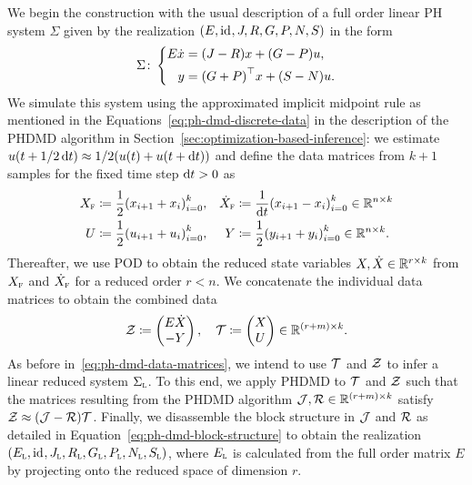 We begin the construction with the usual description of a full order linear \ac{PH} system $\Sigma$ given by the realization $(E, \text{id}_{}, J, R, G, P, N, S)$ in the form
\begin{equation*}
    \Sigma \colon \left\lbrace
    \begin{aligned}
        E \dot{x} &= (J - R) x + (G - P) u, \\
        y &= {(G + P)}^{\top} x + (S - N) u.
    \end{aligned}
    \right.
\end{equation*}
We simulate this system using the approximated implicit midpoint rule as mentioned in the Equations~\eqref{eq:ph-dmd-discrete-data} in the description of the \ac{PHDMD} algorithm in Section~\ref{sec:optimization-based-inference}: we estimate $u(t + 1 / 2 \mathop{}\!\mathrm{d} t) \approx 1 / 2 (u(t) + u(t + \mathop{}\!\mathrm{d} t))$ and define the data matrices from $k + 1$ samples for the fixed time step $\mathop{}\!\mathrm{d} t > 0$ as
\begin{equation}\label{eq:quad-fom-discrete-data}
    \begin{alignedat}{3}
        X_{\textnormal{\scshape f}} &\coloneqq \frac{1}{2} {\left( x_{i + 1} + x_i \right)}_{i = 0}^k,\quad &\dot{X}_{\textnormal{\scshape f}} &\coloneqq \frac{1}{\mathop{}\!\mathrm{d} t} {\left( x_{i + 1} - x_i \right)}_{i = 0}^k \in \mathbb{R}^{n \times k} \\
        U &\coloneqq \frac{1}{2} {\left( u_{i + 1} + u_i \right)}_{i = 0}^k,\quad &Y &\coloneqq \frac{1}{2} {\left( y_{i + 1} + y_i \right)}_{i = 0}^k \in \mathbb{R}^{n \times k}.
    \end{alignedat}
\end{equation}
Thereafter, we use \ac{POD} to obtain the reduced state variables $X, \dot{X} \in \mathbb{R}^{r \times k}$ from $X_{\textnormal{\scshape f}}$ and $\dot{X}_{\textnormal{\scshape f}}$ for a reduced order $r < n$.
We concatenate the individual data matrices to obtain the combined data
\begin{equation*}
    \mathcal{Z} \coloneqq \begin{pmatrix}
        E \dot{X} \\
        -Y
    \end{pmatrix},\quad \mathcal{T} \coloneqq \begin{pmatrix}
        X \\
        U
    \end{pmatrix} \in \mathbb{R}^{(r + m) \times k}.
\end{equation*}
As before in~\eqref{eq:ph-dmd-data-matrices}, we intend to use $\mathcal{T}$ and $\mathcal{Z}$ to infer a linear reduced system $\Sigma_{\textnormal{\scshape l}}$.
To this end, we apply \ac{PHDMD} to $\mathcal{T}$ and $\mathcal{Z}$ such that the matrices resulting from the \ac{PHDMD} algorithm $\mathcal{J}, \mathcal{R} \in \mathbb{R}^{(r + m) \times k}$ satisfy $\mathcal{Z} \approx (\mathcal{J} - \mathcal{R}) \mathcal{T}$.
Finally, we disassemble the block structure in $\mathcal{J}$ and $\mathcal{R}$ as detailed in Equation~\eqref{eq:ph-dmd-block-structure} to obtain the realization $(E_{\textnormal{\scshape l}}, \text{id}_{}, J_{\textnormal{\scshape l}}, R_{\textnormal{\scshape l}}, G_{\textnormal{\scshape l}}, P_{\textnormal{\scshape l}}, N_{\textnormal{\scshape l}}, S_{\textnormal{\scshape l}})$, where $E_{\textnormal{\scshape l}}$ is calculated from the full order matrix $E$ by projecting onto the reduced space of dimension $r$.

